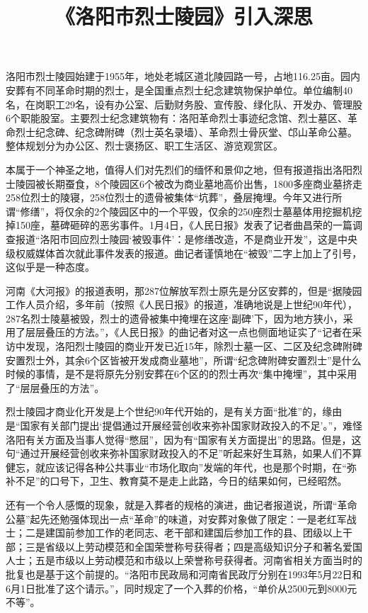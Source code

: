 \documentclass[UTF-8, a4paper]{ctexart}
\title{《洛阳市烈士陵园》引入深思}
\author{}
\date{}
\begin{document}
	\maketitle
	洛阳市烈士陵园始建于1955年，地处老城区道北陵园路一号，占地116.25亩。园内安葬有不同革命时期的烈士，是全国重点烈士纪念建筑物保护单位。单位编制40名，在岗职工29名，设有办公室、后勤财务股、宣传股、绿化队、开发办、管理股6个职能股室。主要烈士纪念建筑物有：洛阳革命烈士事迹纪念馆、烈士墓区、革命烈士纪念碑、纪念碑附碑（烈士英名录墙）、革命烈士骨灰堂、邙山革命公墓。整体规划分为办公区、烈士褒扬区、职工生活区、游览观赏区。
	
	本属于一个神圣之地，值得人们对先烈们的缅怀和景仰之地，但有报道指出洛阳烈士陵园被长期蚕食，8个陵园区6个被改为商业墓地高价出售，1800多座商业墓挤走258位烈士的陵寝，258位烈士的遗骨被集体“坑葬”，叠层掩埋。今年又进行所谓“修缮”，将仅余的2个陵园区中的一个平毁，仅余的250座烈士墓墓体用挖掘机挖掉150座，墓碑砸碎的恶劣事件。1月4日，《人民日报》发表了记者曲昌荣的一篇调查报道“洛阳市回应烈士陵园‘被毁事件’：是修缮改造，不是商业开发”，这是中央级权威媒体首次就此事件发表的报道。曲记者谨慎地在“被毁”二字上加上了引号，这似乎是一种态度。
	
	河南《大河报》的报道表明，那287位解放军烈士原先是分区安葬的，但是“据陵园工作人员介绍，多年前（按照《人民日报》的报道，准确地说是上世纪90年代），287名烈士陵墓被毁，烈士的遗骨被集中掩埋在这座‘副碑’下，因为地方狭小，采用了层层叠压的方法。”，《人民日报》的曲记者对这一点也侧面地证实了“记者在采访中发现，洛阳烈士陵园的商业开发已近15年，除烈士墓一区、二区及纪念碑附碑安置烈士外，其余6个区皆被开发成商业墓地”，所谓“纪念碑附碑安置烈士”是什么时候的事情，是不是将原先分别安葬在6个区的的烈士再次“集中掩埋”，其中采用了“层层叠压的方法”。
	
	烈士陵园才商业化开发是上个世纪90年代开始的，是有关方面“批准”的，缘由是“国家有关部门提出‘提倡通过开展经营创收来弥补国家财政投入的不足’。”，难怪洛阳有关方面及当事人觉得“憋屈”，因为有“国家有关方面提出”的思路。但是，这句“通过开展经营创收来弥补国家财政投入的不足”听起来好生耳熟，如果人们不算健忘，就应该记得各种公共事业“市场化取向”发端的年代，也是那个时期，在“弥补不足”的口号下，卫生、教育莫不是走上此路，今日的结果如何，已经昭然。
	
	还有一个令人感慨的现象，就是入葬者的规格的演进，曲记者报道说，所谓“革命公墓”起先还勉强体现出一点“革命”的味道，对安葬对象做了限定：一是老红军战士；二是建国前参加工作的老同志、老干部和建国后参加工作的县、团级以上干部；三是省级以上劳动模范和全国荣誉称号获得者；四是高级知识分子和著名爱国人士；五是市级以上劳动模范和市级以上荣誉称号获得者。河南省相关方面当时的批复也是基于这个前提的。“洛阳市民政局和河南省民政厅分别在1993年5月22日和6月1日批准了这个请示。”，同时规定了一个入葬的价格，“单价从2500元到8000元不等”。
	
\end{document}
